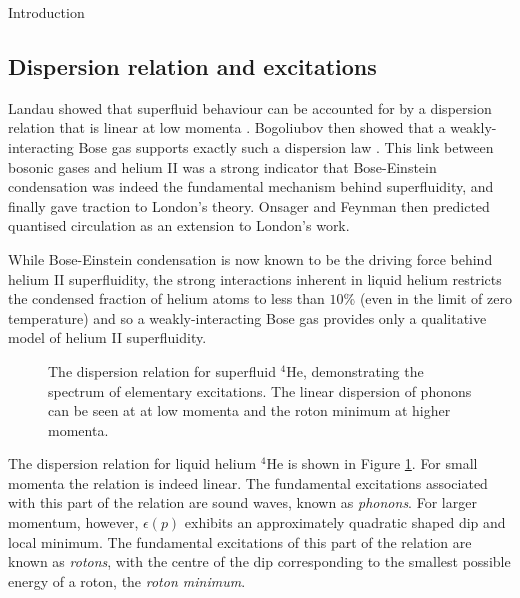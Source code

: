 \begin{chapter}{\label{cha:bose_gases}Introduction}
\subsection{Dispersion relation and excitations}
Landau showed that superfluid behaviour can be accounted for by a dispersion relation that is linear at low momenta \cite{Landau41}. Bogoliubov then showed that a weakly-interacting Bose gas supports exactly such a dispersion law \cite{bogo47}. This link between bosonic gases and helium II was a strong indicator that Bose-Einstein condensation was indeed the fundamental mechanism behind superfluidity, and finally gave traction to London's theory. Onsager \cite{Onsager49} and Feynman \cite{Feynman55} then predicted quantised circulation as an extension to London's work.

While Bose-Einstein condensation is now known to be the driving force behind helium II superfluidity, the strong interactions inherent in liquid helium restricts the condensed fraction of helium atoms to less than $10\%$ \cite{Donnelly} (even in the limit of zero temperature) and so a weakly-interacting Bose gas provides only a qualitative model of helium II superfluidity.

\begin{figure}
	\centering
	\caption{\label{fig:hedisp}The dispersion relation for superfluid $^4$He, demonstrating the spectrum of elementary excitations. The linear dispersion of phonons can be seen at at low momenta and the roton minimum at higher momenta.}
\end{figure}

The dispersion relation for liquid helium $^4$He is shown in Figure \ref{fig:hedisp}. For small momenta the relation is indeed linear. The fundamental excitations associated with this part of the relation are sound waves, known as {\it phonons}. For larger momentum, however, $\epsilon(p)$ exhibits an approximately quadratic shaped dip and local minimum. The fundamental excitations of this part of the relation are known as {\it rotons}, with the centre of the dip corresponding to the smallest possible energy of a roton, the {\it roton minimum}. 


\end{chapter}
